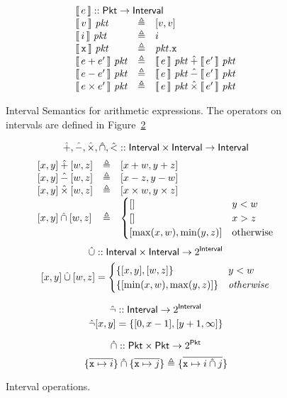 \begin{figure}
  \[\begin{array}{lcl}
      \multicolumn 3 l {\bracbb{e} :: \Pkt \to \Interval}\\
      \bracbb{v}~\pkt &\triangleq& [v,v] \\
      \bracbb{i}~\pkt &\triangleq& i\\
      \bracbb{\var x}~\pkt & \triangleq & \pkt.\var x \\
      \bracbb{e + e'}~\pkt & \triangleq & \bracbb{e}~\pkt \iplus \bracbb{e'}~\pkt \\
      \bracbb{e - e'}~\pkt & \triangleq & \bracbb{e}~\pkt \iminus \bracbb{e'}~\pkt \\
      \bracbb{e \times e'}~\pkt & \triangleq & \bracbb{e}~\pkt \itimes \bracbb{e'}~\pkt\\      
    \end{array}
    \]
  \caption{Interval Semantics for arithmetic expressions. The operators on intervals are defined in Figure~\ref{fig:ivaloperators}}
  \label{fig:expr-semantics}
\end{figure}

\begin{figure}
  \[
    \mathbin{\hat+},\mathbin{\hat{-}},\mathbin{\hat{\times}},\mathbin{\hat{\cap}},\mathbin{\hat{<}} :: \mathsf{Interval} \times \mathsf{Interval} \to \mathsf{Interval}\]
  \[\begin{array}{lcl}
      {[x,y]} \mathbin{\hat+} [w,z] &\triangleq & [x + w, y + z] \\
      {[x,y]} \mathbin{\hat{-}} [w,z] &\triangleq & [x - z, y - w] \\
      {[x,y]} \mathbin{\hat{\times}} [w,z] & \triangleq & [x \times w, y \times z] \\
      {[x,y]} \mathbin{\hat{\cap}} [w,z] & \triangleq & \begin{cases}
        [] &y < w\\
        [] &x > z \\
        [\max(x,w), \min(y,z)] &\mathrm{otherwise}
      \end{cases} 
    \end{array}
  \]
  \[\mathbin{\hat{\cup}} :: \mathsf{Interval} \times \mathsf{Interval}\to 2^{\mathsf{Interval}}\]
  \[[x,y] \mathbin{\hat{\cup}} [w,z] = \begin{cases}
      \{[x,y],[w,z]\} & y < w \\
      \{[\min(x,w), \max(y,z)]\} & \mathit{otherwise}
    \end{cases}\]
    
  
  \[\mathop{\hat{\neg}} :: \mathsf{Interval} \to 2^{\mathsf{Interval}}\]
  \[\mathop{\hat{\neg}} [x,y] = \{[0,x-1],[y+1,\infty]\} \]
  
  \[\mathbin{\hat{\cap}} :: \mathsf{Pkt} \times \mathsf{Pkt} \to 2^{\mathsf{Pkt}}\]
  \[\{\overline{\texttt{x} \mapsto i}\} \mathbin{\hat{\cap}} \{\overline{\texttt{x} \mapsto j}\} \triangleq \{\overline{\texttt{x} \mapsto i \mathbin{\hat{\cap}} j}\}\]

  \caption{Interval operations. }
  \label{fig:ivaloperators}
\end{figure}

